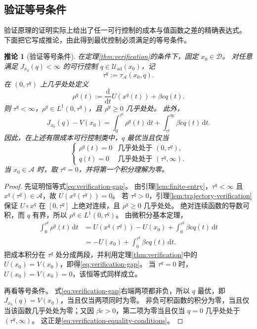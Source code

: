 \documentclass[11pt,a4paper,UTF8]{ctexart}
\newtheorem{corollary}[theorem]{推论}
\theoremstyle{definition}
\newcommand{\Acal}{\mathcal A}
\newcommand{\Dcal}{\mathcal D}
\newcommand{\Uad}{\mathcal U_{\mathrm{ad}}}
\newcommand{\dd}{\,\mathrm d}
\begin{document}
\subsection{验证等号条件}
验证原理的证明实际上给出了任一可行控制的成本与值函数之差的精确表达式。
下面把它写成推论，由此得到最优控制必须满足的等号条件。

\begin{corollary}[验证等号条件]
\label{cor:verification-equality}
在定理\ref{thm:verification}的条件下，固定 $x_0\in\Dcal$。
对任意满足 $J_{x_0}(q)<\infty$ 的可行控制 $q\in\Uad(x_0)$，记
\[
\tau^q:=\tau_{\Acal}(x_0,q).
\]
在 $(0,\tau^q)$ 上几乎处处定义
\begin{equation}
\rho^q(t):=\frac{\mathrm d}{\mathrm d t}U(x^q(t))+\beta cq(t).
\label{eq:trajectory-verification-residual}
\end{equation}
则 $\tau^q<\infty$，$\rho^q\in L^1(0,\tau^q)$，且 $\rho^q\ge0$ 几乎处处。
此外，
\begin{equation}
J_{x_0}(q)-V(x_0)
=
\int_0^{\tau^q}\rho^q(t)\dd t
+
\int_{\tau^q}^{\infty}\beta cq(t)\dd t.
\label{eq:verification-gap}
\end{equation}
因此，在上述有限成本可行控制类中，$q$ 最优当且仅当
\begin{equation}
\begin{cases}
\rho^q(t)=0 & \text{几乎处处于 }(0,\tau^q),\\
q(t)=0 & \text{几乎处处于 }(\tau^q,\infty).
\end{cases}
\label{eq:verification-equality-conditions}
\end{equation}
当 $x_0\in\Acal$ 时，取 $\tau^q=0$，并将第一个积分理解为零。
\end{corollary}

\begin{proof}
先证明恒等式\eqref{eq:verification-gap}。
由引理\ref{lem:finite-entry}，$\tau^q<\infty$ 且 $x^q(\tau^q)\in\Acal$，故 $U(x^q(\tau^q))=0$。
若 $\tau^q>0$，引理\ref{lem:trajectory-verification}保证 $U\circ x^q$ 在 $[0,\tau^q]$ 上绝对连续，且 $\rho^q\ge0$ 几乎处处。
绝对连续函数的导数可积，而 $q$ 有界，所以 $\rho^q\in L^1(0,\tau^q)$。
由微积分基本定理，
\begin{align*}
\int_0^{\tau^q}\rho^q(t)\dd t
&=U(x^q(\tau^q))-U(x_0)
  +\int_0^{\tau^q}\beta cq(t)\dd t\\
&=-U(x_0)+\int_0^{\tau^q}\beta cq(t)\dd t.
\end{align*}
把成本积分在 $\tau^q$ 处分成两段，并利用定理\ref{thm:verification}中的 $U(x_0)=V(x_0)$，即得\eqref{eq:verification-gap}。
当 $\tau^q=0$ 时，$U(x_0)=V(x_0)=0$，该恒等式同样成立。

再看等号条件。
式\eqref{eq:verification-gap}右端两项都非负，所以 $q$ 最优，即 $J_{x_0}(q)=V(x_0)$，当且仅当两项同时为零。
非负可积函数的积分为零，当且仅当该函数几乎处处为零；又因 $\beta c>0$，第二项为零当且仅当 $q=0$ 几乎处处于 $(\tau^q,\infty)$。
这正是\eqref{eq:verification-equality-conditions}。
\end{proof}
\end{document}
